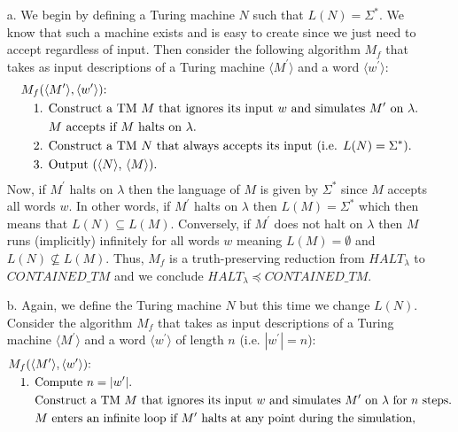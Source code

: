 \documentclass [10pt]{article}
\newcommand{\reduces}{\preceq}%
\begin{document}
\begin{enumerate}
\begin{enumerate}
		\item[a.]We begin by defining a Turing machine $N$ such that $L(N)=\Sigma^{*}$. We know that such a machine exists and is easy to create since we just need to accept regardless of input. Then consider the following algorithm $M_{f}$ that takes as input descriptions of a Turing machine $\langle M^{\prime}\rangle$ and a word $\langle w^{\prime}\rangle$:
		\begin{align}
			&\text{$M_{f}(\langle M^{\prime}\rangle,\langle w^{\prime}\rangle)$:}\nonumber\\
			&\quad\text{$1$. Construct a TM $M$ that ignores its input $w$ and simulates $M^{\prime}$ on $\lambda$.}\nonumber\\
			&\quad\text{\quad\:$M$ accepts if $M$ halts on $\lambda$.}\nonumber\\
			&\quad\text{$2$. Construct a TM $N$ that always accepts its input (i.e. $L(N)=\Sigma^{*}$).}\nonumber\\
			&\quad\text{$3$. Output ($\langle N\rangle$, $\langle M\rangle$).}\nonumber
		\end{align}
		Now, if $M^{\prime}$ halts on $\lambda$ then the language of $M$ is given by $\Sigma^{*}$ since $M$ accepts all words $w$. In other words, if $M^{\prime}$ halts on $\lambda$ then $L(M)=\Sigma^{*}$ which then means that $L(N)\subseteq L(M)$. Conversely, if $M^{\prime}$ does not halt on $\lambda$ then $M$ runs (implicitly) infinitely for all words $w$ meaning $L(M)=\emptyset$ and $L(N)\not\subseteq L(M)$. Thus, $M_{f}$ is a truth-preserving reduction from $HALT_{\lambda}$ to $CONTAINED\_TM$ and we conclude $HALT_{\lambda}\reduces CONTAINED\_TM$.
		\item[b.]Again, we define the Turing machine $N$ but this time we change $L(N)$. Consider the algorithm $M_{f}$ that takes as input descriptions of a Turing machine $\langle M^{\prime}\rangle$ and a word $\langle w^{\prime}\rangle$ of length $n$ (i.e. $\left|w^{\prime}\right|=n$):
		\begin{align}
			&\text{$M_{f}(\langle M^{\prime}\rangle,\langle w^{\prime}\rangle)$:}\nonumber\\
			&\quad\text{$1$. Compute $n=\left|w^{\prime}\right|$.}\nonumber\\
			&\quad\text{\quad\:Construct a TM $M$ that ignores its input $w$ and simulates $M^{\prime}$ on $\lambda$ for $n$ steps.}\nonumber\\
			&\quad\text{\quad\:$M$ enters an infinite loop if $M^{\prime}$ halts at any point during the simulation,}\nonumber\\

\end{align}
\end{enumerate}
\end{enumerate}
\end{document}
